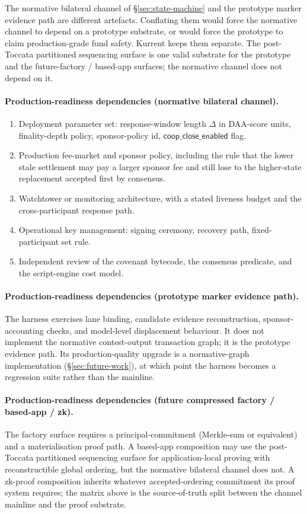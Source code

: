 \documentclass[10pt,a4paper]{article}
\begin{document}
The normative bilateral channel of §\ref{sec:state-machine} and the prototype marker evidence path are different artefacts. Conflating them would force the normative channel to depend on a prototype substrate, or would force the prototype to claim production-grade fund safety. Kurrent keeps them separate. The post-Toccata partitioned sequencing surface \cite{kip21} is one valid substrate for the prototype and the future-factory / based-app surfaces; the normative channel does not depend on it.

\paragraph{Production-readiness dependencies (normative bilateral channel).}
\begin{enumerate}
\item Deployment parameter set: response-window length $\Delta$ in DAA-score units, finality-depth policy, sponsor-policy id, $\mathsf{coop\_close\_enabled}$ flag.
\item Production fee-market and sponsor policy, including the rule that the lower stale settlement may pay a larger sponsor fee and still lose to the higher-state replacement accepted first by consensus.
\item Watchtower or monitoring architecture, with a stated liveness budget and the cross-participant response path.
\item Operational key management: signing ceremony, recovery path, fixed-participant set rule.
\item Independent review of the covenant bytecode, the consensus predicate, and the script-engine cost model.
\end{enumerate}

\paragraph{Production-readiness dependencies (prototype marker evidence path).}
The harness exercises lane binding, candidate evidence reconstruction, sponsor-accounting checks, and model-level displacement behaviour. It does not implement the normative contest-output transaction graph; it is the prototype evidence path. Its production-quality upgrade is a normative-graph implementation (§\ref{sec:future-work}), at which point the harness becomes a regression suite rather than the mainline.

\paragraph{Production-readiness dependencies (future compressed factory / based-app / zk).}
The factory surface requires a principal-commitment (Merkle-sum or equivalent) and a materialisation proof path. A based-app composition may use the post-Toccata partitioned sequencing surface for application-local proving with reconstructible global ordering, but the normative bilateral channel does not. A zk-proof composition inherits whatever accepted-ordering commitment its proof system requires; the matrix above is the source-of-truth split between the channel mainline and the proof substrate.
\end{document}
